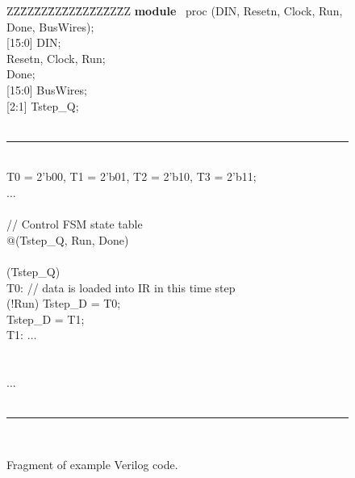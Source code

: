 \documentclass[11pt, twoside, pdftex]{article}
\begin{document}
\begin{figure}[H]
\begin{center}
\begin{minipage}[t]{12.5 cm}
\begin{tabbing}
ZZ\=ZZ\=ZZ\=ZZ\=ZZ\=ZZ\=ZZ\=ZZ\=ZZ\kill
{\bf module} ~proc (DIN, Resetn, Clock, Run, Done, BusWires);\\
 [15:0] DIN;\\
 Resetn, Clock, Run;\\
 Done;\\
 [15:0] BusWires;\\
 [2:1] Tstep\_Q;\\
~\rule{5.0in}{0in}\\
 T0 = 2'b00, T1 = 2'b01, T2 = 2'b10, T3 = 2'b11;\\
\>$\ldots$\\
~\\
\>// Control FSM state table\\
 @(Tstep\_Q, Run, Done)\\
\\
\> (Tstep\_Q)\\
\>\>\>T0: // data is loaded into IR in this time step\\
\>\>\> (!Run) Tstep\_D = T0;\\
\>\>\> Tstep\_D = T1;\\
\>\>\>T1: $\ldots$\\
\>\\
\\

\>$\ldots$\\

~\rule{5.0in}{0in}\\
\end{tabbing}
\end{minipage}
\end{center}
\caption{Fragment of example Verilog code.} 
\label{fig:fig28}
\end{figure}
\end{document}
